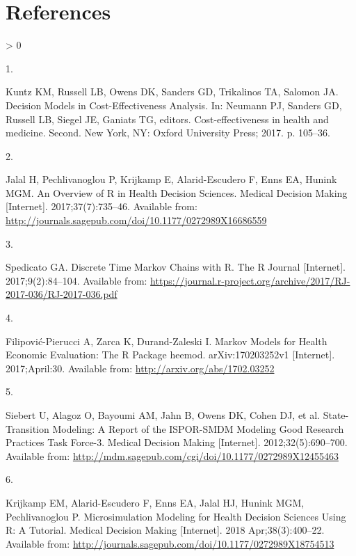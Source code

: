 \documentclass[
]{article}
\newlength{\cslhangindent}
\newlength{\csllabelwidth}
\newenvironment{CSLReferences}[2] %
 {%
  \setlength{\parindent}{0pt}
  \ifodd #1 \everypar{\setlength{\hangindent}{\cslhangindent}}\ignorespaces\fi
  \ifnum #2 > 0
  \setlength{\parskip}{#2\baselineskip}
  \fi
 }%
 {}
\newcommand{\CSLLeftMargin}[1]{\parbox[t]{\csllabelwidth}{#1}}
\newcommand{\CSLRightInline}[1]{\parbox[t]{\linewidth - \csllabelwidth}{#1}\break}
\begin{document}
\hypertarget{references}{%
\section*{References}\label{references}}

\hypertarget{refs}{}
\begin{CSLReferences}{0}{0}
\leavevmode\hypertarget{ref-Kuntz2017}{}%
\CSLLeftMargin{1. }
\CSLRightInline{Kuntz KM, Russell LB, Owens DK, Sanders GD, Trikalinos TA, Salomon JA. {Decision Models in Cost-Effectiveness Analysis}. In: Neumann PJ, Sanders GD, Russell LB, Siegel JE, Ganiats TG, editors. Cost-effectiveness in health and medicine. Second. New York, NY: Oxford University Press; 2017. p. 105--36. }

\leavevmode\hypertarget{ref-Jalal2017b}{}%
\CSLLeftMargin{2. }
\CSLRightInline{Jalal H, Pechlivanoglou P, Krijkamp E, Alarid-Escudero F, Enns EA, Hunink MGM. {An Overview of R in Health Decision Sciences}. Medical Decision Making {[}Internet{]}. 2017;37(7):735--46. Available from: \url{http://journals.sagepub.com/doi/10.1177/0272989X16686559}}

\leavevmode\hypertarget{ref-Spedicato2017}{}%
\CSLLeftMargin{3. }
\CSLRightInline{Spedicato GA. {Discrete Time Markov Chains with R}. The R Journal {[}Internet{]}. 2017;9(2):84--104. Available from: \url{https://journal.r-project.org/archive/2017/RJ-2017-036/RJ-2017-036.pdf}}

\leavevmode\hypertarget{ref-Filipovic-Pierucci2017}{}%
\CSLLeftMargin{4. }
\CSLRightInline{Filipović-Pierucci A, Zarca K, Durand-Zaleski I. {Markov Models for Health Economic Evaluation: The R Package heemod}. arXiv:170203252v1 {[}Internet{]}. 2017;April:30. Available from: \url{http://arxiv.org/abs/1702.03252}}

\leavevmode\hypertarget{ref-Siebert2012c}{}%
\CSLLeftMargin{5. }
\CSLRightInline{Siebert U, Alagoz O, Bayoumi AM, Jahn B, Owens DK, Cohen DJ, et al. {State-Transition Modeling: A Report of the ISPOR-SMDM Modeling Good Research Practices Task Force-3}. Medical Decision Making {[}Internet{]}. 2012;32(5):690--700. Available from: \url{http://mdm.sagepub.com/cgi/doi/10.1177/0272989X12455463}}

\leavevmode\hypertarget{ref-Krijkamp2018}{}%
\CSLLeftMargin{6. }
\CSLRightInline{Krijkamp EM, Alarid-Escudero F, Enns EA, Jalal HJ, Hunink MGM, Pechlivanoglou P. {Microsimulation Modeling for Health Decision Sciences Using R: A Tutorial}. Medical Decision Making {[}Internet{]}. 2018 Apr;38(3):400--22. Available from: \url{http://journals.sagepub.com/doi/10.1177/0272989X18754513}}


\end{CSLReferences}
\end{document}

